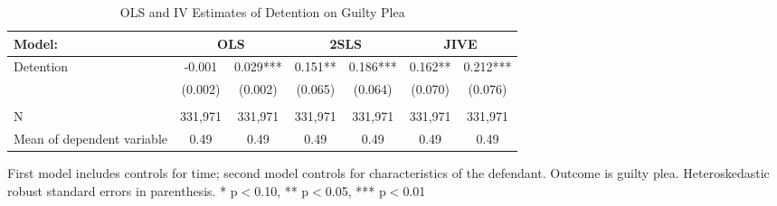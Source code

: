 \begin{table}[htbp]\centering
\footnotesize
\caption{OLS and IV Estimates of Detention on Guilty Plea}
\label{screening}
\begin{center}
\begin{threeparttable}
\begin{tabular}{l*{6}{c}}
\toprule
\multicolumn{1}{l}{Model:}&
\multicolumn{2}{c}{\textbf{OLS}}&
\multicolumn{2}{c}{\textbf{2SLS}}&
\multicolumn{2}{c}{\textbf{JIVE}}\\
\midrule
Detention           &      -0.001   &       0.029***&       0.151** &       0.186***&       0.162** &       0.212***\\
                    &     (0.002)   &     (0.002)   &     (0.065)   &     (0.064)   &     (0.070)   &     (0.076)   \\
\\
\midrule
N                   &     331,971   &     331,971   &     331,971   &     331,971   &     331,971   &     331,971   \\
Mean of dependent variable&        0.49   &        0.49   &        0.49   &        0.49   &        0.49   &        0.49   \\
\bottomrule
\end{tabular}
\begin{tablenotes}
\tiny
\item First model includes controls for time; second model controls for characteristics of the defendant.  Outcome is guilty plea.  Heteroskedastic robust standard errors in parenthesis.  * p$<$0.10, ** p$<$0.05, *** p$<$0.01
\end{tablenotes}
\end{threeparttable}
\end{center}
\end{table}
